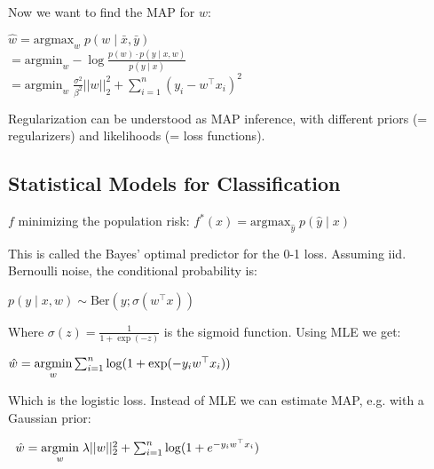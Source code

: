 Now we want to find the MAP for $w$:

$\hat w = \text{argmax}_w \; p(w \; | \; \bar x, \bar y)$ \\[-8pt]

\quad $= \text{argmin}_w - \log \frac{p(w) \cdot p( y \; | \; x, w)}{p( y \; | \; x)} $ \\[-8pt]

\quad $= \text{argmin}_w \; \frac{\sigma^2}{\beta^2} ||w||_2^2 + \sum_{i=1}^n(y_i - w^\top x_i)^2$

Regularization can be understood as MAP inference, with different priors (= regularizers) and likelihoods (= loss functions).

\subsection*{Statistical Models for Classification}

$f$ minimizing the population risk: $f^*(x) = \text{argmax}_{\hat y} \; p(\hat y \; | \; x)$

This is called the Bayes' optimal predictor for the 0-1 loss. Assuming iid. Bernoulli noise, the conditional probability is:

\qquad \qquad$p(y \; | \; x,w) \sim \text{Ber}(y; \sigma(w^\top x))$

Where $\sigma(z) = \frac{1}{1 + \exp(-z)}$ is the sigmoid function. Using MLE we get:

\quad \;$\hat w = \underset{w}{\text{argmin}} \sum_{i = 1}^n \log (1 + \exp(-y_i w^\top x_i))$

Which is the logistic loss. Instead of MLE we can estimate MAP, e.g. with a Gaussian prior:

$\; \;\hat w = \underset{w}{\text{argmin}} \; \lambda ||w||_2^2 + \sum_{i = 1}^n \log (1 + e^{-y_i w^\top x_i})$






